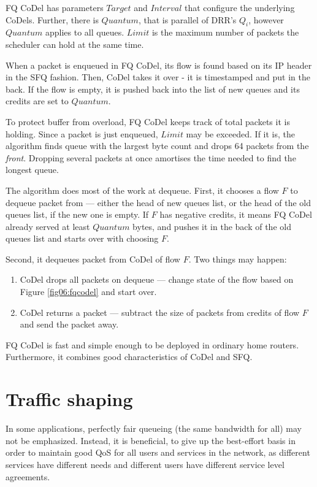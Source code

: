 FQ CoDel has parameters $Target$ and $Interval$ that configure the underlying CoDels. Further, there is $Quantum$, that is parallel of DRR's $Q_i$, however $Quantum$ applies to all queues. $Limit$ is the maximum number of packets the scheduler can hold at the same time.

When a packet is enqueued in FQ CoDel, its flow is found based on its IP header in the SFQ fashion. Then, CoDel takes it over - it is timestamped and put in the back. If the flow is empty, it is pushed back into the list of new queues and its credits are set to $Quantum$.

To protect buffer from overload, FQ CoDel keeps track of total packets it is holding. Since a packet is just enqueued, $Limit$ may be exceeded. If it is, the algorithm finds queue with the largest byte count and drops 64 packets from the \textit{front}. Dropping several packets at once amortises the time needed to find the longest queue.

The algorithm does most of the work at dequeue. First, it chooses a flow $F$ to dequeue packet from --- either the head of new queues list, or the head of the old queues list, if the new one is empty. If $F$ has negative credits, it means FQ CoDel already served at least $Quantum$ bytes, and pushes it in the back of the old queues list and starts over with choosing $F$.

Second, it dequeues packet from CoDel of flow $F$. Two things may happen:
\begin{enumerate}
	\item CoDel drops all packets on dequeue --- change state of the flow based on Figure \ref{fig06:fqcodel} and start over.
	\item CoDel returns a packet --- subtract the size of packets from credits of flow $F$ and send the packet away.
\end{enumerate}

FQ CoDel is fast and simple enough to be deployed in ordinary home routers. Furthermore, it combines good characteristics of CoDel and SFQ.

\section{Traffic shaping}

In some applications, perfectly fair queueing (the same bandwidth for all) may not be emphasized. Instead, it is beneficial, to give up the best-effort basis in order to maintain good QoS for all users and services in the network, as different services have different needs and different users have different service level agreements. 

